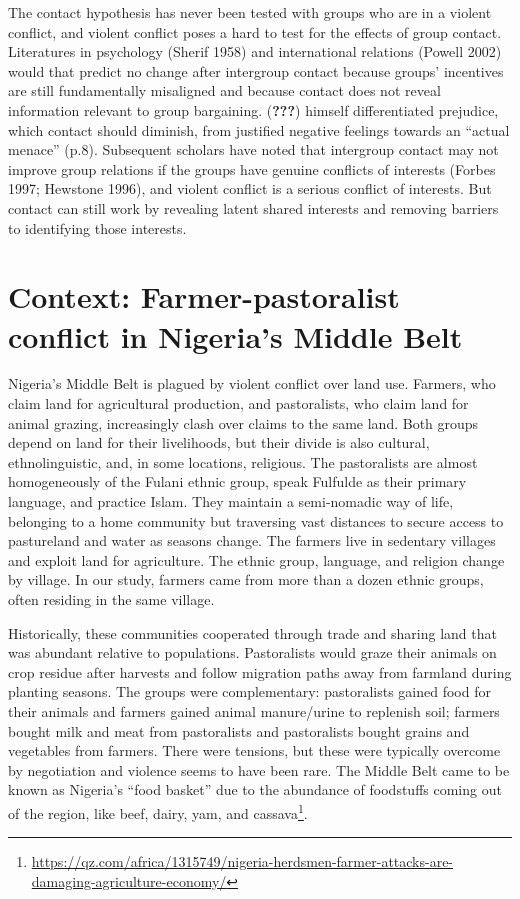 \documentclass[11pt]{article}
\begin{document}
The contact hypothesis has never been tested with groups who are in a
violent conflict, and violent conflict poses a hard to test for the
effects of group contact. Literatures in psychology (Sherif 1958) and
international relations (Powell 2002) would that predict no change after
intergroup contact because groups' incentives are still fundamentally
misaligned and because contact does not reveal information relevant to
group bargaining. ({\textbf{???}}) himself differentiated prejudice,
which contact should diminish, from justified negative feelings towards
an ``actual menace'' (p.8). Subsequent scholars have noted that
intergroup contact may not improve group relations if the groups have
genuine conflicts of interests (Forbes 1997; Hewstone 1996), and violent
conflict is a serious conflict of interests. But contact can still work
by revealing latent shared interests and removing barriers to
identifying those interests.

\hypertarget{context-farmer-pastoralist-conflict-in-nigerias-middle-belt}{%
\section{Context: Farmer-pastoralist conflict in Nigeria's Middle
Belt}\label{context-farmer-pastoralist-conflict-in-nigerias-middle-belt}}

Nigeria's Middle Belt is plagued by violent conflict over land use.
Farmers, who claim land for agricultural production, and pastoralists,
who claim land for animal grazing, increasingly clash over claims to the
same land. Both groups depend on land for their livelihoods, but their
divide is also cultural, ethnolinguistic, and, in some locations,
religious. The pastoralists are almost homogeneously of the Fulani
ethnic group, speak Fulfulde as their primary language, and practice
Islam. They maintain a semi-nomadic way of life, belonging to a home
community but traversing vast distances to secure access to pastureland
and water as seasons change. The farmers live in sedentary villages and
exploit land for agriculture. The ethnic group, language, and religion
change by village. In our study, farmers came from more than a dozen
ethnic groups, often residing in the same village.

Historically, these communities cooperated through trade and sharing
land that was abundant relative to populations. Pastoralists would graze
their animals on crop residue after harvests and follow migration paths
away from farmland during planting seasons. The groups were
complementary: pastoralists gained food for their animals and farmers
gained animal manure/urine to replenish soil; farmers bought milk and
meat from pastoralists and pastoralists bought grains and vegetables
from farmers. There were tensions, but these were typically overcome by
negotiation and violence seems to have been rare. The Middle Belt came
to be known as Nigeria's ``food basket'' due to the abundance of
foodstuffs coming out of the region, like beef, dairy, yam, and
cassava\footnote{\url{https://qz.com/africa/1315749/nigeria-herdsmen-farmer-attacks-are-damaging-agriculture-economy/}}.
\end{document}
